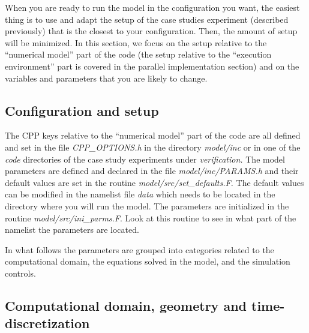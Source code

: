 When you are ready to run the model in the configuration you want, the
easiest thing is to use and adapt the setup of the case studies
experiment (described previously) that is the closest to your
configuration. Then, the amount of setup will be minimized. In this
section, we focus on the setup relative to the ``numerical model''
part of the code (the setup relative to the ``execution environment''
part is covered in the parallel implementation section) and on the
variables and parameters that you are likely to change.

\subsection{Configuration and setup}

The CPP keys relative to the ``numerical model'' part of the code are
all defined and set in the file \textit{CPP\_OPTIONS.h }in the
directory \textit{ model/inc }or in one of the \textit{code
}directories of the case study experiments under
\textit{verification.} The model parameters are defined and declared
in the file \textit{model/inc/PARAMS.h }and their default values are
set in the routine \textit{model/src/set\_defaults.F. }The default
values can be modified in the namelist file \textit{data }which needs
to be located in the directory where you will run the model. The
parameters are initialized in the routine
\textit{model/src/ini\_parms.F}.  Look at this routine to see in what
part of the namelist the parameters are located.

In what follows the parameters are grouped into categories related to
the computational domain, the equations solved in the model, and the
simulation controls.

\subsection{Computational domain, geometry and time-discretization}

